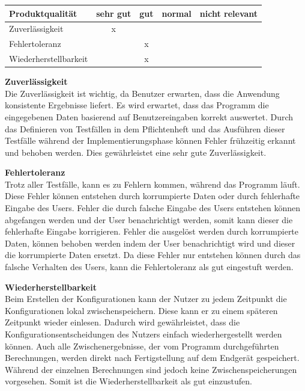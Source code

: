 \documentclass[parskip=full]{scrartcl} %
\begin{document}
    \begin{tabular}{|l| c| c| c| c|}
    \hline
        Produktqualität & sehr gut & gut & normal & nicht relevant \\
    \hline
        Zuverlässigkeit & x & & &\\
    \hline
        Fehlertoleranz & & x & &\\
    \hline
        Wiederherstellbarkeit & & x & &\\
    \hline
     \end{tabular}

\textbf{Zuverlässigkeit\\}
Die Zuverlässigkeit ist wichtig, da Benutzer erwarten, dass die Anwendung konsistente Ergebnisse liefert.
Es wird erwartet, dass das Programm die eingegebenen Daten basierend auf Benutzereingaben korrekt auswertet.
Durch das Definieren von Testfällen in dem Pflichtenheft und das Ausführen dieser Testfälle während der Implementierungsphase können Fehler frühzeitig erkannt und behoben werden.
Dies gewährleistet eine sehr gute Zuverlässigkeit.

\textbf{Fehlertoleranz\\}
Trotz aller Testfälle, kann es zu Fehlern kommen, während das Programm läuft. Diese Fehler können entstehen durch korrumpierte Daten oder durch fehlerhafte Eingabe des Users.
Fehler die durch falsche Eingabe des Users entstehen können abgefangen werden und der User benachrichtigt werden, somit kann dieser die fehlerhafte Eingabe korrigieren.
Fehler die ausgelöst werden durch korrumpierte Daten, können behoben werden indem der User benachrichtigt wird und dieser die korrumpierte Daten ersetzt.
Da diese Fehler nur entstehen können durch das falsche Verhalten des Users, kann 
die Fehlertoleranz als gut eingestuft werden.

\textbf{Wiederherstellbarkeit\\}
Beim Erstellen der Konfigurationen kann der Nutzer zu jedem Zeitpunkt die Konfigurationen lokal zwischenspeichern. Diese kann er zu einem späteren Zeitpunkt wieder einlesen. Dadurch wird gewährleistet, dass die Konfigurationsentscheidungen des Nutzers einfach wiederhergestellt werden können.
Auch alle Zwischenergebnisse, der vom Programm durchgeführten Berechnungen, werden direkt nach Fertigstellung auf dem Endgerät gespeichert. Während der einzelnen Berechnungen sind jedoch keine Zwischenspeicherungen vorgesehen.
Somit ist die Wiederherstellbarkeit als gut einzustufen.


\newpage 
\end{document}
